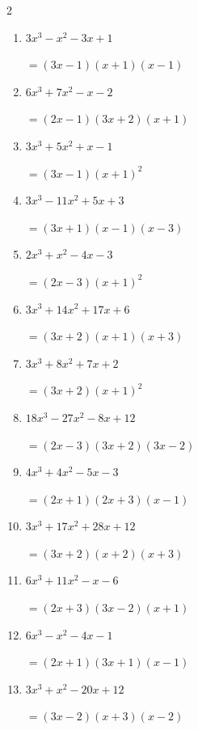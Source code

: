 \begin{multicols}{2}
\begin{enumerate}
  \itemsep=95pt
  \item $3x^{3}-x^{2}-3x+1$

        $=(3x-1)(x+1)(x-1)$

  \item $6x^{3}+7x^{2}-x-2$

        $=(2x-1)(3x+2)(x+1)$

  \item $3x^{3}+5x^{2}+x-1$

        $=(3x-1)(x+1) ^{ 2 }$

  \item $3x^{3}-11x^{2}+5x+3$

        $=(3x+1)(x-1)(x-3)$

  \item $2x^{3}+x^{2}-4x-3$

        $=(2x-3)(x+1) ^{ 2 }$

\columnbreak %

  \item $3x^{3}+14x^{2}+17x+6$

        $=(3x+2)(x+1)(x+3)$

  \item $3x^{3}+8x^{2}+7x+2$

        $=(3x+2)(x+1) ^{ 2 }$

  \item $18x^{3}-27x^{2}-8x+12$

        $=(2x-3)(3x+2)(3x-2)$

  \item $4x^{3}+4x^{2}-5x-3$

        $=(2x+1)(2x+3)(x-1)$

  \item $3x^{3}+17x^{2}+28x+12$

        $=(3x+2)(x+2)(x+3)$

\columnbreak %

\resetques

  \item $6x^{3}+11x^{2}-x-6$

        $=(2x+3)(3x-2)(x+1)$

  \item $6x^{3}-x^{2}-4x-1$

        $=(2x+1)(3x+1)(x-1)$

  \item $3x^{3}+x^{2}-20x+12$

        $=(3x-2)(x+3)(x-2)$


\end{enumerate}
\end{multicols}
